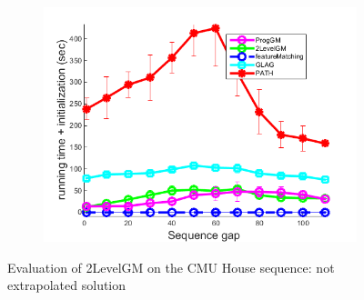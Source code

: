 \begin{figure}[h]
\begin{subfigure}[b]{0.32\textwidth}
			\includegraphics[scale=0.25]{"chapter3/fig/HouseSeq2/anchor_descr/using_cpd_afftrafo/solution2/performance/time_summary"}
		\end{subfigure} 	
	\caption[Evaluation of 2LevelGM on the CMU House sequence]{Evaluation of 2LevelGM on the CMU House sequence: not extrapolated solution} \label{fig:House_sol}
\end{figure}

